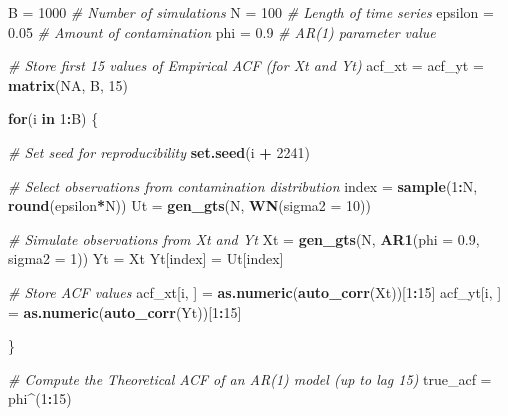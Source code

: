 \documentclass[]{book}
\newenvironment{Shaded}{\begin{snugshade}}{\end{snugshade}}
\newcommand{\KeywordTok}[1]{\textcolor[rgb]{0.13,0.29,0.53}{\textbf{#1}}}
\newcommand{\DataTypeTok}[1]{\textcolor[rgb]{0.13,0.29,0.53}{#1}}
\newcommand{\DecValTok}[1]{\textcolor[rgb]{0.00,0.00,0.81}{#1}}
\newcommand{\FloatTok}[1]{\textcolor[rgb]{0.00,0.00,0.81}{#1}}
\newcommand{\StringTok}[1]{\textcolor[rgb]{0.31,0.60,0.02}{#1}}
\newcommand{\CommentTok}[1]{\textcolor[rgb]{0.56,0.35,0.01}{\textit{#1}}}
\newcommand{\OtherTok}[1]{\textcolor[rgb]{0.56,0.35,0.01}{#1}}
\newcommand{\ControlFlowTok}[1]{\textcolor[rgb]{0.13,0.29,0.53}{\textbf{#1}}}
\newcommand{\OperatorTok}[1]{\textcolor[rgb]{0.81,0.36,0.00}{\textbf{#1}}}
\newcommand{\NormalTok}[1]{#1}
\theoremstyle{definition}
\theoremstyle{definition}
\theoremstyle{definition}
\theoremstyle{remark}
\begin{document}
\begin{Shaded}
\begin{Highlighting}[]
\NormalTok{B =}\StringTok{ }\DecValTok{1000} \CommentTok{# Number of simulations}
\NormalTok{N =}\StringTok{ }\DecValTok{100} \CommentTok{# Length of time series}
\NormalTok{epsilon =}\StringTok{ }\FloatTok{0.05} \CommentTok{# Amount of contamination}
\NormalTok{phi =}\StringTok{ }\FloatTok{0.9} \CommentTok{# AR(1) parameter value}

\CommentTok{# Store first 15 values of Empirical ACF (for Xt and Yt)}
\NormalTok{acf_xt =}\StringTok{ }\NormalTok{acf_yt =}\StringTok{ }\KeywordTok{matrix}\NormalTok{(}\OtherTok{NA}\NormalTok{, B, }\DecValTok{15}\NormalTok{)}

\ControlFlowTok{for}\NormalTok{(i }\ControlFlowTok{in} \DecValTok{1}\OperatorTok{:}\NormalTok{B) \{}
  
  \CommentTok{# Set seed for reproducibility}
  \KeywordTok{set.seed}\NormalTok{(i }\OperatorTok{+}\StringTok{ }\DecValTok{2241}\NormalTok{)}

  \CommentTok{# Select observations from contamination distribution}
\NormalTok{  index =}\StringTok{ }\KeywordTok{sample}\NormalTok{(}\DecValTok{1}\OperatorTok{:}\NormalTok{N, }\KeywordTok{round}\NormalTok{(epsilon}\OperatorTok{*}\NormalTok{N))}
\NormalTok{  Ut =}\StringTok{ }\KeywordTok{gen_gts}\NormalTok{(N, }\KeywordTok{WN}\NormalTok{(}\DataTypeTok{sigma2 =} \DecValTok{10}\NormalTok{))}

  \CommentTok{# Simulate observations from Xt and Yt}
\NormalTok{  Xt =}\StringTok{ }\KeywordTok{gen_gts}\NormalTok{(N, }\KeywordTok{AR1}\NormalTok{(}\DataTypeTok{phi =} \FloatTok{0.9}\NormalTok{, }\DataTypeTok{sigma2 =} \DecValTok{1}\NormalTok{))}
\NormalTok{  Yt =}\StringTok{ }\NormalTok{Xt}
\NormalTok{  Yt[index] =}\StringTok{ }\NormalTok{Ut[index]}
  
  \CommentTok{# Store ACF values}
\NormalTok{  acf_xt[i, ] =}\StringTok{ }\KeywordTok{as.numeric}\NormalTok{(}\KeywordTok{auto_corr}\NormalTok{(Xt))[}\DecValTok{1}\OperatorTok{:}\DecValTok{15}\NormalTok{]}
\NormalTok{  acf_yt[i, ] =}\StringTok{ }\KeywordTok{as.numeric}\NormalTok{(}\KeywordTok{auto_corr}\NormalTok{(Yt))[}\DecValTok{1}\OperatorTok{:}\DecValTok{15}\NormalTok{]}
  
\NormalTok{\}}

\CommentTok{# Compute the Theoretical ACF of an AR(1) model (up to lag 15)}
\NormalTok{true_acf =}\StringTok{ }\NormalTok{phi}\OperatorTok{^}\NormalTok{(}\DecValTok{1}\OperatorTok{:}\DecValTok{15}\NormalTok{)}


\end{Highlighting}
\end{Shaded}
\end{document}
